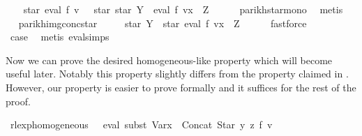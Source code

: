 \begin{isabellebody}
\ \isamarkupfalse%
\ {\isachardoublequoteopen}{\isasymPsi}\ {\isacharparenleft}{\kern0pt}star\ {\isacharparenleft}{\kern0pt}eval\ f\ v{\isacharparenright}{\kern0pt}{\isacharparenright}{\kern0pt}\ {\isasymsubseteq}\ {\isasymPsi}\ {\isacharparenleft}{\kern0pt}star\ {\isacharparenleft}{\kern0pt}star\ Y\ {\isacharat}{\kern0pt}{\isacharat}{\kern0pt}\ eval\ f\ {\isacharparenleft}{\kern0pt}v{\isacharparenleft}{\kern0pt}x\ {\isacharcolon}{\kern0pt}{\isacharequal}{\kern0pt}\ Z{\isacharparenright}{\kern0pt}{\isacharparenright}{\kern0pt}{\isacharparenright}{\kern0pt}{\isacharparenright}{\kern0pt}{\isachardoublequoteclose}\isanewline
\ \ \ \ \isamarkupfalse%
\ parikh{\isacharunderscore}{\kern0pt}star{\isacharunderscore}{\kern0pt}mono\ \isamarkupfalse%
\ metis\isanewline
\ \ \isamarkupfalse%
\ \isamarkupfalse%
\ parikh{\isacharunderscore}{\kern0pt}img{\isacharunderscore}{\kern0pt}conc{\isacharunderscore}{\kern0pt}star\ \isamarkupfalse%
\ {\isachardoublequoteopen}{\isasymdots}\ {\isasymsubseteq}\ {\isasymPsi}\ {\isacharparenleft}{\kern0pt}star\ Y\ {\isacharat}{\kern0pt}{\isacharat}{\kern0pt}\ star\ {\isacharparenleft}{\kern0pt}eval\ f\ {\isacharparenleft}{\kern0pt}v{\isacharparenleft}{\kern0pt}x\ {\isacharcolon}{\kern0pt}{\isacharequal}{\kern0pt}\ Z{\isacharparenright}{\kern0pt}{\isacharparenright}{\kern0pt}{\isacharparenright}{\kern0pt}{\isacharparenright}{\kern0pt}{\isachardoublequoteclose}\isanewline
\ \ \ \ \isamarkupfalse%
\ fastforce\isanewline
\ \ \isamarkupfalse%
\ \isamarkupfalse%
\ {\isacharquery}{\kern0pt}case\ \isamarkupfalse%
\ {\isacharparenleft}{\kern0pt}metis\ eval{\isachardot}{\kern0pt}simps{\isacharparenleft}{\kern0pt}{}{\isacharparenright}{\kern0pt}{\isacharparenright}{\kern0pt}\isanewline
{}\isamarkupfalse%
%
\endisatagproof
{\isafoldproof}%
%
\isadelimproof
%
\endisadelimproof
%
\begin{isamarkuptext}%
Now we can prove the desired homogeneous-like property which will become useful later.
Notably this property slightly differs from the property claimed in \cite{Pilling}. However, our
property is easier to prove formally and it suffices for the rest of the proof.%
\end{isamarkuptext}\isamarkuptrue%
\isamarkupfalse%
\ rlexp{\isacharunderscore}{\kern0pt}homogeneous{\isacharcolon}{\kern0pt}\ \ {\isachardoublequoteopen}{\isasymPsi}\ {\isacharparenleft}{\kern0pt}eval\ {\isacharparenleft}{\kern0pt}subst\ {\isacharparenleft}{\kern0pt}Var{\isacharparenleft}{\kern0pt}x\ {\isacharcolon}{\kern0pt}{\isacharequal}{\kern0pt}\ Concat\ {\isacharparenleft}{\kern0pt}Star\ y{\isacharparenright}{\kern0pt}\ z{\isacharparenright}{\kern0pt}{\isacharparenright}{\kern0pt}\ f{\isacharparenright}{\kern0pt}\ v{\isacharparenright}{\kern0pt}\isanewline

\end{isabellebody}
